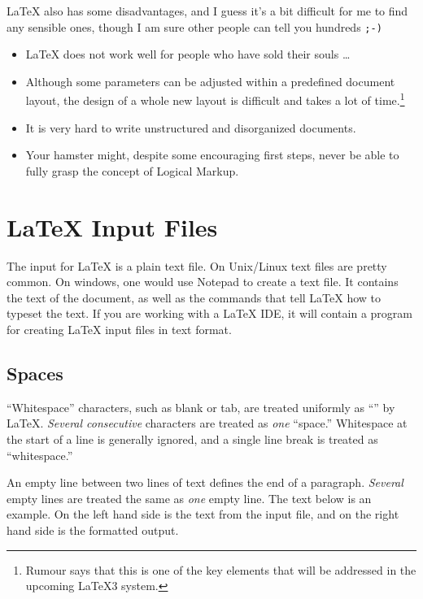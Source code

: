 \medskip

\noindent\LaTeX{} also has some disadvantages, and I guess it's a bit
difficult for me to find any sensible ones, though I am sure other people
can tell you hundreds \texttt{;-)}

\begin{itemize}
\item \LaTeX{} does not work well for people who have sold their
  souls \ldots
\item Although some parameters can be adjusted within a predefined
  document layout, the design of a whole new layout is difficult and
  takes a lot of time.\footnote{Rumour says that this is one of the
    key elements that will be addressed in the upcoming \LaTeX 3
    system.}
\item It is very hard to write unstructured and disorganized documents.
\item Your hamster might, despite some encouraging first steps, never be
able to fully grasp the concept of Logical Markup.
\end{itemize}

\section{\LaTeX{} Input Files}

The input for \LaTeX{} is a plain text file. On Unix/Linux text files are
pretty common. On windows, one would use Notepad to create a text file. It
contains the text of the document, as well as the commands that tell
\LaTeX{} how to typeset the text. If you are working with a LaTeX IDE, it will contain a program for creating
\LaTeX{} input files in text format.

\subsection{Spaces}

``Whitespace'' characters, such as blank or tab, are
treated uniformly as ``'' by \LaTeX{}. \emph{Several
  consecutive}  characters are treated as \emph{one}
``space.''  Whitespace at the start of a line is generally ignored, and
a single line break is treated as ``whitespace.''

An empty line between two lines of text defines the end of a
paragraph. \emph{Several} empty lines are treated the same as
\emph{one} empty line. The text below is an example. On the left hand
side is the text from the input file, and on the right hand side is the
formatted output.

